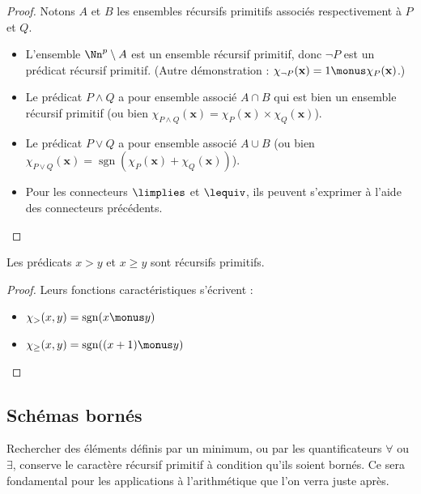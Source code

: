 \documentclass[11pt,class=report,crop=false]{standalone}
\begin{document}
\begin{proof}
Notons $A$ et $B$ les ensembles récursifs primitifs associés respectivement à $P$ et $Q$.
\begin{itemize}
    \item L'ensemble $\Nn^p \setminus A$ est un ensemble récursif primitif, donc $\lnot P$ est un prédicat récursif primitif. (Autre démonstration : $\chi_{\lnot P}(\mathbf{x}) = 1 \monus \chi_P(\mathbf{x})$.)

    \item Le prédicat $P \land Q$ a pour ensemble associé $A \cap B$ qui est bien un ensemble récursif primitif (ou bien $\chi_{P \land Q}(\mathbf{x}) = \chi_P(\mathbf{x}) \times \chi_Q(\mathbf{x})$).

    \item Le prédicat $P \lor Q$ a pour ensemble associé $A \cup B$ (ou bien $\chi_{P \lor Q}(\mathbf{x}) = \operatorname{sgn}(\chi_P(\mathbf{x}) + \chi_Q(\mathbf{x}))$).

    \item Pour les connecteurs $\limplies$ et $\lequiv$, ils peuvent s'exprimer à l'aide des connecteurs précédents.
\end{itemize}
\end{proof}

\begin{proposition}
Les prédicats \og{}$x > y$\fg{} et \og{}$x \ge y$\fg{} sont récursifs primitifs.
\end{proposition}

\begin{proof}
Leurs fonctions caractéristiques s'écrivent :
\begin{itemize}
    \item $\chi_{>}(x,y) = \operatorname{sgn}(x \monus y)$
    \item $\chi_{\ge}(x,y) = \operatorname{sgn}((x+1) \monus y)$
\end{itemize}
\end{proof}


\subsection{Schémas bornés}

Rechercher des éléments définis par un minimum, ou par les quantificateurs $\forall$ ou $\exists$, conserve le caractère récursif primitif à condition qu'ils soient bornés. Ce sera fondamental pour les applications à l'arithmétique que l'on verra juste après.
\end{document}
